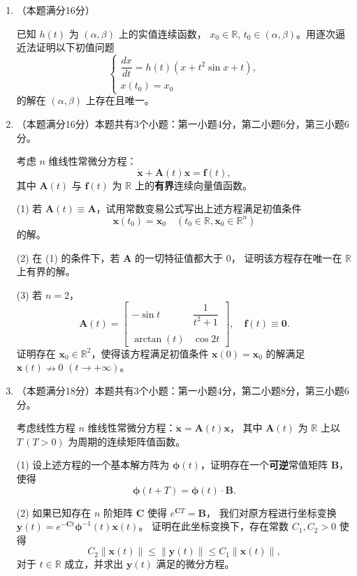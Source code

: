 \begin{enumerate}
\item[7.] （本题满分16分）

已知 $h(t)$ 为 $(\alpha, \beta)$ 上的实值连续函数，
$x_0 \in \mathbb{R}$, $t_0 \in (\alpha, \beta)$。用逐次逼近法证明以下初值问题
\[
\begin{cases}
\dfrac{dx}{dt} = h(t)(x + t^2 \sin x + t), \\
x(t_0) = x_0
\end{cases}
\]
的解在 $(\alpha, \beta)$ 上存在且唯一。


\item[8.] （本题满分16分）本题共有3个小题：第一小题4分，第二小题6分，第三小题6分。

考虑 $n$ 维线性常微分方程：
\[ 
\dot{\boldsymbol{x}} + \boldsymbol{A}(t)\boldsymbol{x} = \boldsymbol{f}(t),
\]
其中 $\boldsymbol{A}(t)$ 与 $\boldsymbol{f}(t)$ 为 $\mathbb{R}$ 上的\textbf{有界}连续向量值函数。

(1)
若 $\boldsymbol{A}(t) \equiv \boldsymbol{A}$，试用常数变易公式写出上述方程满足初值条件
\[
\boldsymbol{x}(t_0) = \boldsymbol{x}_0 \quad (t_0 \in \mathbb{R}, \boldsymbol{x}_0 \in \mathbb{R}^n)
\]
的解。

(2)
在 (1) 的条件下，若 $\boldsymbol{A}$ 的一切特征值都大于 $0$，
证明该方程存在唯一在 $\mathbb{R}$ 上有界的解。

(3)
若 $n = 2$，
\[
\boldsymbol{A}(t) = 
\begin{bmatrix}
-\sin t & \dfrac{1}{t^2+1} \\ \\
\arctan(t) & \cos 2t
\end{bmatrix}, \quad \boldsymbol{f}(t) \equiv \boldsymbol{0}.
\]
证明存在 $\boldsymbol{x}_0 \in \mathbb{R}^2$，使得该方程满足初值条件
$\boldsymbol{x}(0) = \boldsymbol{x}_0$
的解满足
$\boldsymbol{x}(t) \nrightarrow 0$ $(t \to +\infty)$。

\item[9.] （本题满分18分）本题共有3个小题：第一小题4分，第二小题8分，第三小题6分。

考虑线性方程 $n$ 维线性常微分方程：$\dot{\boldsymbol{x}} = \boldsymbol{A}(t)\boldsymbol{x}$，
其中 $\boldsymbol{A}(t)$ 为 $\mathbb{R}$ 上以 $T\,(T > 0)$ 为周期的连续矩阵值函数。

(1)
设上述方程的一个基本解方阵为 $\boldsymbol{\phi}(t)$，证明存在一个\textbf{可逆}常值矩阵 $\boldsymbol{B}$，使得
\[
\boldsymbol{\phi}(t + T) = \boldsymbol{\phi}(t) \cdot \boldsymbol{B}.
\]

(2)
如果已知存在 $n$ 阶矩阵 $\boldsymbol{C}$ 使得 $e^{\boldsymbol{C}T} = \boldsymbol{B}$，
我们对原方程进行坐标变换 $\boldsymbol{y}(t) = e^{-\boldsymbol{C}t}\boldsymbol{\phi}^{-1}(t)\boldsymbol{x}(t)$。
证明在此坐标变换下，存在常数 $C_1, C_2 > 0$ 使得
\[
C_2\|\boldsymbol{x}(t)\| \leq \|\boldsymbol{y}(t)\| \leq C_1\|\boldsymbol{x}(t)\|,
\]
对于 $t \in \mathbb{R}$ 成立，并求出 $\boldsymbol{y}(t)$ 满足的微分方程。


\end{enumerate}
